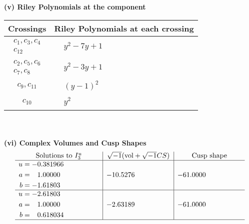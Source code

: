 \documentclass[1p]{elsarticle_modified}
\theoremstyle{definition}
\newcommand{\I}{\sqrt{-1}}
\begin{document}
\newpage\renewcommand{\arraystretch}{1}
\flushleft \textbf{(v) Riley Polynomials at the component}\newline \\
\begin{tabular}{m{50pt}|m{274pt}}
Crossings & \hspace{64pt}Riley Polynomials at each crossing \\
\hline $$\begin{aligned}c_{1},c_{3},c_{4}\\c_{12}\end{aligned}$$&$\begin{aligned}
&y^2-7 y+1
\end{aligned}$\\
\hline $$\begin{aligned}c_{2},c_{5},c_{6}\\c_{7},c_{8}\end{aligned}$$&$\begin{aligned}
&y^2-3 y+1
\end{aligned}$\\
\hline $$\begin{aligned}c_{9},c_{11}\end{aligned}$$&$\begin{aligned}
&(y-1)^2
\end{aligned}$\\
\hline $$\begin{aligned}c_{10}\end{aligned}$$&$\begin{aligned}
&y^2
\end{aligned}$\\
\hline
\end{tabular}\\~\\
\newpage\flushleft \textbf{(vi) Complex Volumes and Cusp Shapes}
$$\begin{array}{c|c|c}  
\text{Solutions to }I^u_{3}& \I (\text{vol} + \sqrt{-1}CS) & \text{Cusp shape}\\
 \hline 
\begin{aligned}
u &= -0.381966\phantom{ +0.000000I} \\
a &= \phantom{-}1.00000\phantom{ +0.000000I} \\
b &= -1.61803\phantom{ +0.000000I}\end{aligned}
 & -10.5276\phantom{ +0.000000I} & -61.0000\phantom{ +0.000000I} \\ \hline\begin{aligned}
u &= -2.61803\phantom{ +0.000000I} \\
a &= \phantom{-}1.00000\phantom{ +0.000000I} \\
b &= \phantom{-}0.618034\phantom{ +0.000000I}\end{aligned}
 & -2.63189\phantom{ +0.000000I} & -61.0000\phantom{ +0.000000I}\\
 \hline 
 \end{array}$$\newpage
\end{document}
